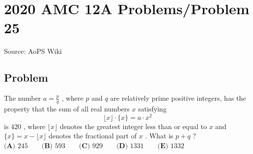 \documentclass[12pt]{article}
\begin{document}
\section*{{2020 AMC 12A Problems/Problem 25}}
Source: AoPS Wiki

\subsection*{Problem}
The number $a=\frac{p}{q}$ , where $p$ and $q$ are relatively prime positive integers, has the property that the sum of all real numbers $x$ satisfying \[\lfloor x \rfloor \cdot \{x\} = a \cdot x^2\] is $420$ , where $\lfloor x \rfloor$ denotes the greatest integer less than or equal to $x$ and $\{x\}=x- \lfloor x \rfloor$ denotes the fractional part of $x$ . What is $p+q$ ? $\textbf{(A) } 245 \qquad \textbf{(B) } 593 \qquad \textbf{(C) } 929 \qquad \textbf{(D) } 1331 \qquad \textbf{(E) } 1332$
\end{document}
